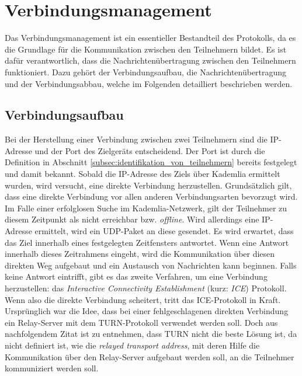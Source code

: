 \section{Verbindungsmanagement}
\label{subsec:verbindungsmanagement}

Das Verbindungsmanagement ist ein essentieller Bestandteil des Protokolls, da es die Grundlage für die Kommunikation zwischen den Teilnehmern bildet. Es ist dafür verantwortlich, dass die Nachrichtenübertragung zwischen den Teilnehmern funktioniert. Dazu gehört der Verbindungsaufbau, die Nachrichtenübertragung und der Verbindungsabbau, welche im Folgenden detailliert beschrieben werden.

\subsection{Verbindungsaufbau}
\label{label:verbindungsaufbau}

Bei der Herstellung einer Verbindung zwischen zwei Teilnehmern sind die IP-Adresse und der Port des Zielgeräts entscheidend. Der Port ist durch die Definition in Abschnitt \ref{subsec:identifikation_von_teilnehmern} bereits festgelegt und damit bekannt. Sobald die IP-Adresse des Ziels über Kademlia ermittelt wurden, wird versucht, eine direkte Verbindung herzustellen. Grundsätzlich gilt, dass eine direkte Verbindung vor allen anderen Verbindungsarten bevorzugt wird. Im Falle einer erfolglosen Suche im Kademlia-Netzwerk, gilt der Teilnehmer zu diesem Zeitpunkt als nicht erreichbar bzw. \textit{offline}. Wird allerdings eine IP-Adresse ermittelt, wird ein UDP-Paket an diese gesendet. Es wird erwartet, dass das Ziel innerhalb eines festgelegten Zeitfensters antwortet. Wenn eine Antwort innerhalb dieses Zeitrahmens eingeht, wird die Kommunikation über diesen direkten Weg aufgebaut und ein Austausch von Nachrichten kann beginnen. Falls keine Antwort eintrifft, gibt es das zweite Verfahren, um eine Verbindung herzustellen: das \textit{Interactive Connectivity Establishment} (kurz: \textit{ICE}) Protokoll. Wenn also die direkte Verbindung scheitert, tritt das ICE-Protokoll in Kraft.
Ursprünglich war die Idee, dass bei einer fehlgeschlagenen direkten Verbindung ein Relay-Server mit dem TURN-Protokoll verwendet werden soll. Doch aus nachfolgendem Zitat ist zu entnehmen, dass TURN nicht die beste Lösung ist, da nicht definiert ist, wie die \textit{relayed transport address}, mit deren Hilfe die Kommunikation über den Relay-Server aufgebaut werden soll, an die Teilnehmer kommuniziert werden soll.

